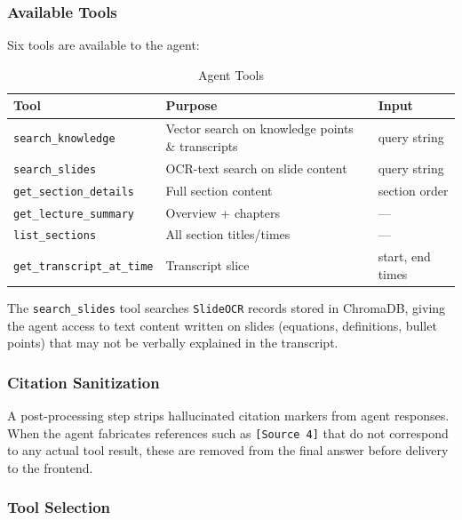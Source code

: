 \subsubsection{Available Tools}

Six tools are available to the agent:

\begin{table}[H]
    \centering
    \caption{Agent Tools}
    \begin{tabular}{@{}p{4.2cm}p{5.8cm}p{2.5cm}@{}}
        \toprule
        \textbf{Tool} & \textbf{Purpose} & \textbf{Input} \\ \midrule
        \texttt{search\_knowledge} & Vector search on knowledge points \& transcripts & query string \\
        \texttt{search\_slides}    & OCR-text search on slide content                & query string \\
        \texttt{get\_section\_details} & Full section content & section order \\
        \texttt{get\_lecture\_summary} & Overview + chapters & --- \\
        \texttt{list\_sections} & All section titles/times & --- \\
        \texttt{get\_transcript\_at\_time} & Transcript slice & start, end times \\ \bottomrule
    \end{tabular}
\end{table}

The \texttt{search\_slides} tool searches \texttt{SlideOCR} records stored in ChromaDB, giving the agent access to text content written on slides (equations, definitions, bullet points) that may not be verbally explained in the transcript.

\subsubsection{Citation Sanitization}

A post-processing step strips hallucinated citation markers from agent responses. When the agent fabricates references such as \texttt{[Source 4]} that do not correspond to any actual tool result, these are removed from the final answer before delivery to the frontend.

\subsubsection{Tool Selection}

